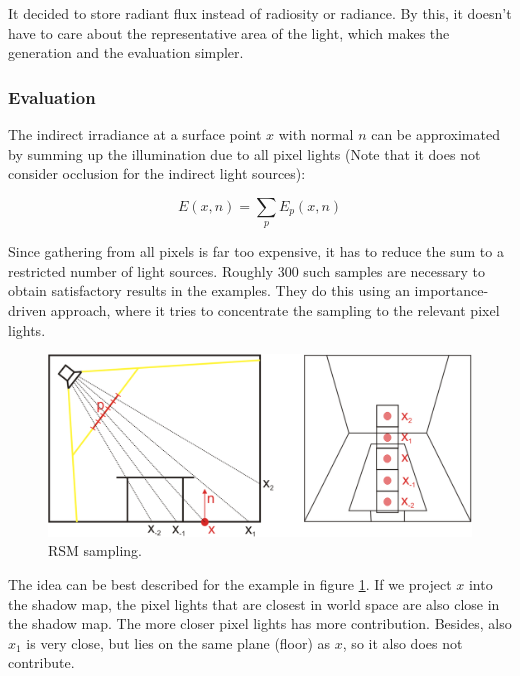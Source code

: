 It decided to store radiant flux instead of radiosity or radiance. By this, it doesn't have to care about the representative area of the light, which makes the generation and the evaluation simpler.



\subsubsection{Evaluation}
The indirect irradiance at a surface point $x$ with normal $n$ can be approximated by summing up the illumination due to all pixel lights (Note that it does not consider occlusion for the indirect light sources):

\begin{equation*}
	E(x,n)=\sum_{p}E_p(x,n)
\end{equation*}

Since gathering from all pixels is far too expensive, it has to reduce the sum to a restricted number of light sources. Roughly 300 such samples are necessary to obtain satisfactory results in the examples. They do this using an importance-driven approach, where it tries to concentrate the sampling to the relevant pixel lights.


\begin{figure}\label{f:rsm-2}
\begin{center}
	\includegraphics[width=1.0\textwidth]{graphics/ir/ir-2-2}	
\end{center}
	\caption{RSM sampling.}
\end{figure}

The idea can be best described for the example in figure \ref{f:rsm-2}. If we project $x$ into the shadow map, the pixel lights that are closest in world space are also close in the shadow map. The more closer pixel lights has more contribution. Besides, also $x_1$ is very close, but lies on the same plane (floor) as $x$, so it also does not contribute. 

